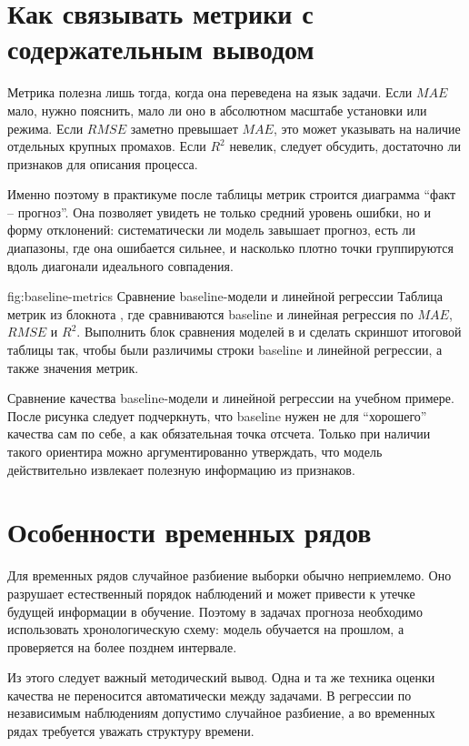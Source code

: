 \section{Как связывать метрики с содержательным выводом}

Метрика полезна лишь тогда, когда она переведена на язык задачи. Если \(MAE\) мало, нужно пояснить, мало ли оно в абсолютном масштабе установки или режима. Если \(RMSE\) заметно превышает \(MAE\), это может указывать на наличие отдельных крупных промахов. Если \(R^2\) невелик, следует обсудить, достаточно ли признаков для описания процесса.

Именно поэтому в практикуме после таблицы метрик строится диаграмма ``факт -- прогноз''. Она позволяет увидеть не только средний уровень ошибки, но и форму отклонений: систематически ли модель завышает прогноз, есть ли диапазоны, где она ошибается сильнее, и насколько плотно точки группируются вдоль диагонали идеального совпадения.

\screenshotplaceholder
  {fig:baseline-metrics}
  {Сравнение baseline-модели и линейной регрессии}
  {Таблица метрик из блокнота , где сравниваются baseline и линейная регрессия по \(MAE\), \(RMSE\) и \(R^2\).}
  {Выполнить блок сравнения моделей в  и сделать скриншот итоговой таблицы так, чтобы были различимы строки baseline и линейной регрессии, а также значения метрик.}

\figureinstruction
  {Сравнение качества baseline-модели и линейной регрессии на учебном примере.}
  {После рисунка следует подчеркнуть, что baseline нужен не для ``хорошего'' качества сам по себе, а как обязательная точка отсчета. Только при наличии такого ориентира можно аргументированно утверждать, что модель действительно извлекает полезную информацию из признаков.}

\section{Особенности временных рядов}

Для временных рядов случайное разбиение выборки обычно неприемлемо. Оно разрушает естественный порядок наблюдений и может привести к утечке будущей информации в обучение. Поэтому в задачах прогноза необходимо использовать хронологическую схему: модель обучается на прошлом, а проверяется на более позднем интервале.

Из этого следует важный методический вывод. Одна и та же техника оценки качества не переносится автоматически между задачами. В регрессии по независимым наблюдениям допустимо случайное разбиение, а во временных рядах требуется уважать структуру времени.


